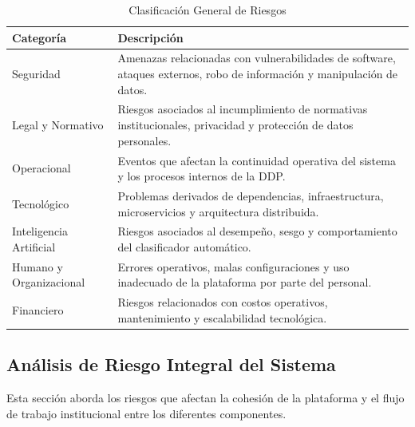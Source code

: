 \documentclass[12pt,oneside,letterpaper]{book}
\renewcommand{\arraystretch}{1.3}
\begin{document}
\begin{table}[H]
\centering
\caption{Clasificación General de Riesgos}
\label{tab:clasificacion_riesgos}
\renewcommand{\arraystretch}{1.4}
\begin{tabular}{|p{3cm}|p{10cm}|}
\hline
\textbf{Categoría} & \textbf{Descripción} \\ \hline

Seguridad &
Amenazas relacionadas con vulnerabilidades de software, ataques externos, robo de información y manipulación de datos. \\ \hline

Legal y Normativo &
Riesgos asociados al incumplimiento de normativas institucionales, privacidad y protección de datos personales. \\ \hline

Operacional &
Eventos que afectan la continuidad operativa del sistema y los procesos internos de la DDP. \\ \hline

Tecnológico &
Problemas derivados de dependencias, infraestructura, microservicios y arquitectura distribuida. \\ \hline

Inteligencia Artificial &
Riesgos asociados al desempeño, sesgo y comportamiento del clasificador automático. \\ \hline

Humano y Organizacional &
Errores operativos, malas configuraciones y uso inadecuado de la plataforma por parte del personal. \\ \hline

Financiero &
Riesgos relacionados con costos operativos, mantenimiento y escalabilidad tecnológica. \\ \hline

\end{tabular}
\end{table}

\subsection{Análisis de Riesgo Integral del Sistema}

Esta sección aborda los riesgos que afectan la cohesión de la plataforma y el flujo de trabajo institucional entre los diferentes componentes.
\end{document}
